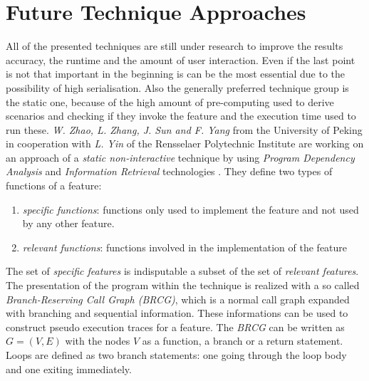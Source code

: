 \section{Future Technique Approaches}
\label{sec:SNIAFL}
All of the presented techniques are still under research to improve the results accuracy, the runtime and the amount of user interaction. Even if the last point is not that important in the beginning is can be the most essential due to the possibility of high serialisation. Also the generally preferred technique group is the static one, because of the high amount of pre-computing used to derive scenarios and checking if they invoke the feature and the execution time used to run these.\newline
\textit{W. Zhao, L. Zhang, J. Sun and F. Yang} from the University of Peking in cooperation with \textit{L. Yin} of the Rensselaer Polytechnic Institute are working on an approach of a \textit{static non-interactive} technique by using \textit{Program Dependency Analysis} and \textit{Information Retrieval} technologies \cite{zhao2006sniafl}.\newline
They define two types of functions of a feature:
\begin{enumerate}
	\item \textit{specific functions}:
	functions only used to implement the feature and not used by any other feature.
	\item \textit{relevant functions}:
	functions involved in the implementation of the feature
\end{enumerate}
The set of \textit{specific features} is indisputable a subset of the set of \textit{ relevant features}.
The presentation of the program within the technique is realized with a so called \textit{Branch-Reserving Call Graph (BRCG)}, which is a normal call graph expanded with branching and sequential information. These informations can be used to construct pseudo execution traces for a feature. The \textit{BRCG} can be written as $G=(V,E)$ with the nodes $V$ as a function, a branch or a return statement. Loops are defined as two branch statements: one going through the loop body and one exiting immediately.


